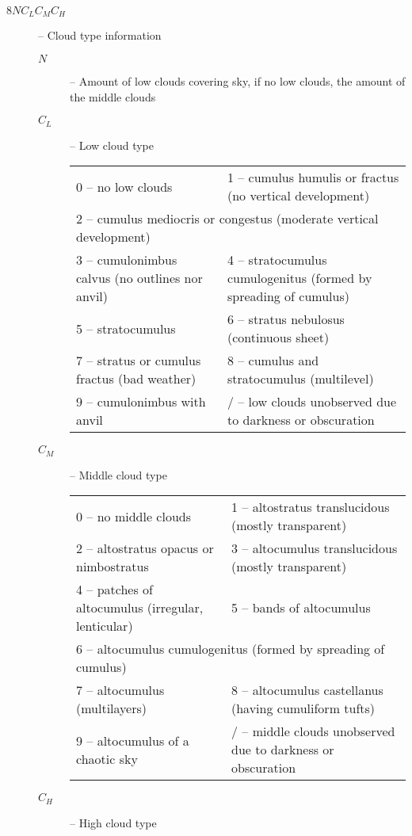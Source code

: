 \documentclass{article}
\begin{document}
\begin{description}
  \item[$8NC_LC_MC_H$] -- Cloud type information
    \begin{description}
      \item[$N$] -- Amount of low clouds covering sky, if no low clouds, the amount of the middle clouds
      \item[$C_L$] -- Low cloud type

        \begin{tabular}{ll}
          0 -- no low clouds& 1 -- cumulus humulis or fractus (no vertical development)\\
          \multicolumn{2}{l}{2 -- cumulus mediocris or congestus (moderate vertical development)}\\
          3 -- cumulonimbus calvus (no outlines nor anvil)&4 -- stratocumulus cumulogenitus (formed by spreading of cumulus)\\
          5 -- stratocumulus& 6 -- stratus nebulosus (continuous sheet)\\
          7 -- stratus or cumulus fractus (bad weather)&8 -- cumulus and stratocumulus (multilevel)\\
          9 -- cumulonimbus with anvil&/ -- low clouds unobserved due to darkness or obscuration
        \end{tabular}
      \item[$C_M$] -- Middle cloud type
        
        \begin{tabular}{ll} 
         0 -- no middle clouds&1 -- altostratus translucidous (mostly transparent)\\
          2 -- altostratus opacus or nimbostratus&3 -- altocumulus translucidous (mostly transparent)\\
          4 -- patches of altocumulus (irregular, lenticular)&5 -- bands of altocumulus\\
          \multicolumn{2}{l}{6 -- altocumulus cumulogenitus (formed by spreading of cumulus)}\\
          7 -- altocumulus (multilayers)&8 -- altocumulus castellanus (having cumuliform tufts)\\
          9 -- altocumulus of a chaotic sky&/ -- middle clouds unobserved due to darkness or obscuration \\
        \end{tabular}
      \item[$C_H$] -- High cloud type


\end{description}
\end{description}
\end{document}

